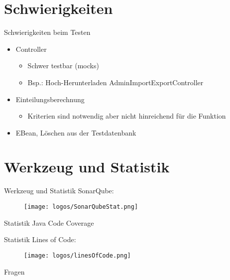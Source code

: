 \documentclass[18pt, xcolor=table]{beamer}
\begin{document}
\section{Schwierigkeiten}
\begin{frame}{Schwierigkeiten beim Testen}
\begin{itemize}
  \item Controller
  \begin{itemize}
  	\item Schwer testbar (mocks)
  	\item Bsp.: Hoch-Herunterladen AdminImportExportController 
  \end{itemize}
  \item Einteilungsberechnung
  \begin{itemize}
  	\item Kriterien sind notwendig aber nicht hinreichend für die Funktion	
  \end{itemize}
  \item EBean, Löschen aus der Testdatenbank
\end{itemize}
\end{frame}

\section{Werkzeug und Statistik}
\begin{frame}{Werkzeug und Statistik}
	SonarQube:
	\begin{figure}
  			\texttt{[image: logos/SonarQubeStat.png]}
  		\end{figure}
\end{frame}

\begin{frame}{Statistik}
	Java Code Coverage
\end{frame}

\begin{frame}{Statistik}
	Lines of Code:
	\begin{figure}
  			\texttt{[image: logos/linesOfCode.png]}
  	\end{figure}
\end{frame}

\appendix
\beginbackup

\begin{frame}{Fragen}
\printbibliography
\end{frame}

\backupend
\end{document}
